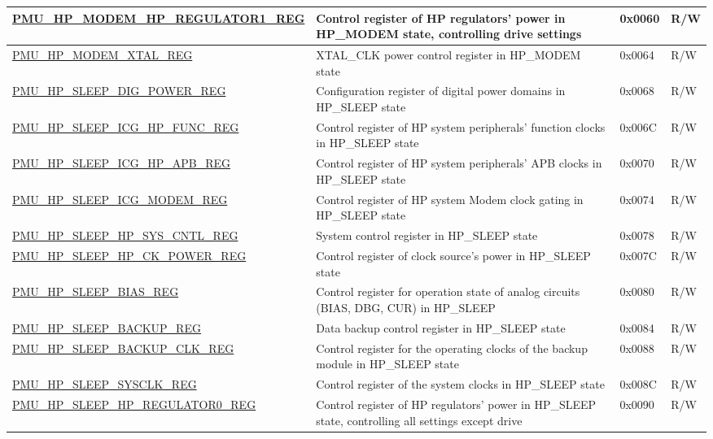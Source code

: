 \begin{longtable}{ | l | p{6cm} | p{1.3cm} | p{1.5cm} | }
\hyperref[regdesc:PMUHPMODEMHPREGULATOR1REG]{PMU\_HP\_MODEM\_HP\_REGULATOR1\_REG} & Control register of HP regulators' power in HP\_MODEM state, controlling drive settings & 0x0060 & R/W \\ \hline
\hyperref[regdesc:PMUHPMODEMXTALREG]{PMU\_HP\_MODEM\_XTAL\_REG} & XTAL\_CLK power control register in HP\_MODEM state & 0x0064 & R/W \\ \hline
\hyperref[regdesc:PMUHPSLEEPDIGPOWERREG]{PMU\_HP\_SLEEP\_DIG\_POWER\_REG} & Configuration register of digital power domains in HP\_SLEEP state & 0x0068 & R/W \\ \hline
\hyperref[regdesc:PMUHPSLEEPICGHPFUNCREG]{PMU\_HP\_SLEEP\_ICG\_HP\_FUNC\_REG} & Control register of HP system peripherals' function clocks in HP\_SLEEP state & 0x006C & R/W \\ \hline
\hyperref[regdesc:PMUHPSLEEPICGHPAPBREG]{PMU\_HP\_SLEEP\_ICG\_HP\_APB\_REG} & Control register of HP system peripherals' APB clocks in HP\_SLEEP state & 0x0070 & R/W \\\hline
\hyperref[regdesc:PMUHPSLEEPICGMODEMREG]{PMU\_HP\_SLEEP\_ICG\_MODEM\_REG} & Control register of HP system Modem clock gating in HP\_SLEEP state & 0x0074 & R/W \\ \hline
\hyperref[regdesc:PMUHPSLEEPHPSYSCNTLREG]{PMU\_HP\_SLEEP\_HP\_SYS\_CNTL\_REG} & System control register in HP\_SLEEP state & 0x0078 & R/W \\ \hline
\hyperref[regdesc:PMUHPSLEEPHPCKPOWERREG]{PMU\_HP\_SLEEP\_HP\_CK\_POWER\_REG} & Control register of clock source's power in HP\_SLEEP state & 0x007C & R/W \\ \hline
\hyperref[regdesc:PMUHPSLEEPBIASREG]{PMU\_HP\_SLEEP\_BIAS\_REG} & Control register for operation state of analog circuits (BIAS, DBG, CUR) in HP\_SLEEP & 0x0080 & R/W \\ \hline
\hyperref[regdesc:PMUHPSLEEPBACKUPREG]{PMU\_HP\_SLEEP\_BACKUP\_REG} & Data backup control register in HP\_SLEEP state & 0x0084 & R/W \\ \hline
\hyperref[regdesc:PMUHPSLEEPBACKUPCLKREG]{PMU\_HP\_SLEEP\_BACKUP\_CLK\_REG} &  Control register for the operating clocks of the backup module in HP\_SLEEP state & 0x0088 & R/W \\ \hline
\hyperref[regdesc:PMUHPSLEEPSYSCLKREG]{PMU\_HP\_SLEEP\_SYSCLK\_REG} & Control register of the system clocks in HP\_SLEEP state & 0x008C & R/W \\ \hline
\hyperref[regdesc:PMUHPSLEEPHPREGULATOR0REG]{PMU\_HP\_SLEEP\_HP\_REGULATOR0\_REG} & Control register of HP regulators' power in HP\_SLEEP state, controlling all settings except drive & 0x0090 & R/W \\ \hline

\end{longtable}
